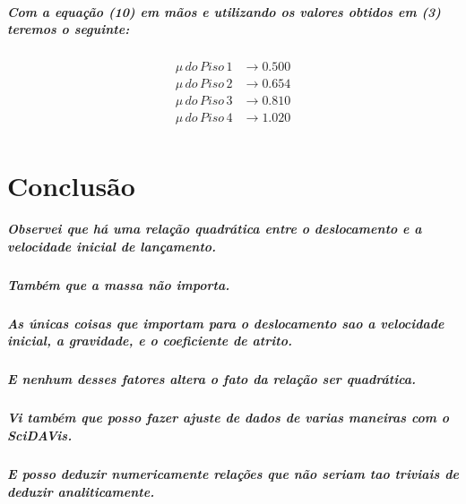 \documentclass[12pt,twoside, a4paper, twocolumn]{article}
\begin{document}
\subparagraph*{Com a equação (10) em mãos e utilizando os valores obtidos em (3) teremos o seguinte:}

\begin{equation}
    \begin{aligned}
        \mu \, do \, Piso\, 1 & \rightarrow 0.500 \\
        \mu \, do \, Piso\, 2 & \rightarrow 0.654 \\
        \mu \, do \, Piso\, 3 & \rightarrow 0.810 \\
        \mu \, do \, Piso\, 4 & \rightarrow 1.020 \\
    \end{aligned}
\end{equation}

\section{Conclusão}

\subparagraph*{Observei que há uma relação quadrática entre o deslocamento e a velocidade inicial de lançamento.   }

\subparagraph*{Também que a massa não importa.}

\subparagraph*{As únicas coisas que importam para o deslocamento sao a velocidade inicial, a gravidade, e o coeficiente de atrito.}

\subparagraph*{E nenhum desses fatores altera o fato da relação ser quadrática.}

\subparagraph*{Vi também que posso fazer ajuste de dados de varias maneiras com o SciDAVis.}

\subparagraph*{E posso deduzir numericamente relações que não seriam tao triviais de deduzir analiticamente.}
\end{document}
